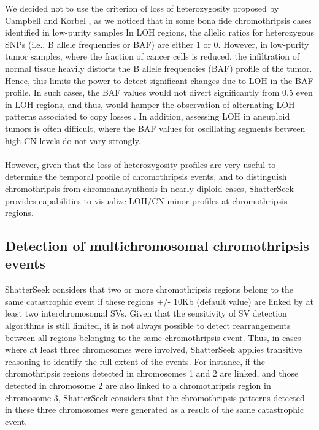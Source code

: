 \documentclass[twoside,a4wide,11pt]{article}\usepackage[]{graphicx}\usepackage[]{color}
\begin{document}
We decided not to use the criterion of loss of heterozygosity proposed by Campbell and Korbel \cite{Korbel2013}, 
as we noticed that in some bona fide chromothripsis cases identified in low-purity samples 
In LOH regions, the allelic ratios for heterozygous SNPs (i.e., B allele frequencies or BAF) are either 1 or 0.
However, in low-purity tumor samples, where the fraction of cancer cells is reduced,
the infiltration of normal tissue heavily distorts the B allele frequencies (BAF) profile of the tumor.
Hence, this limits the power to detect significant changes due to LOH in the BAF profile. 
In such cases, the BAF values would not divert significantly from 0.5 even in LOH regions, and thus, would hamper the observation of alternating LOH patterns associated to copy losses \cite{Song2012}.
In addition, assessing LOH in aneuploid tumors is often difficult,
where the BAF values for oscillating segments between high CN levels do not vary strongly.\\
\\
However, given that the loss of heterozygosity profiles are very useful to
determine the temporal profile of chromothripsis events, 
and to distinguish chromothripsis from chromoanasynthesis in nearly-diploid cases,
ShatterSeek provides capabilities to visualize LOH/CN minor profiles at chromothripsis regions.
\\

\subsection{Detection of multichromosomal chromothripsis events}
ShatterSeek considers that two or more  chromothripsis regions belong to the same 
catastrophic event if these regions +/- 10Kb (default value) are linked by at least two interchromosomal SVs.
Given that the sensitivity of SV detection algorithms is still limited,
it is not always possible to detect rearrangements between all regions belonging to the same chromothripsis event.
Thus, in cases where at least three chromosomes were involved, 
ShatterSeek applies transitive reasoning to identify the full extent of the events. 
For instance, if the chromothripsis regions detected in chromosomes 1 and 2 are linked, and those detected in chromosome 2 are also linked to a chromothripsis region in chromosome 3, ShatterSeek considers that the chromothripsis patterns detected in these three chromosomes were generated as a result of the same catastrophic event.
\end{document}
